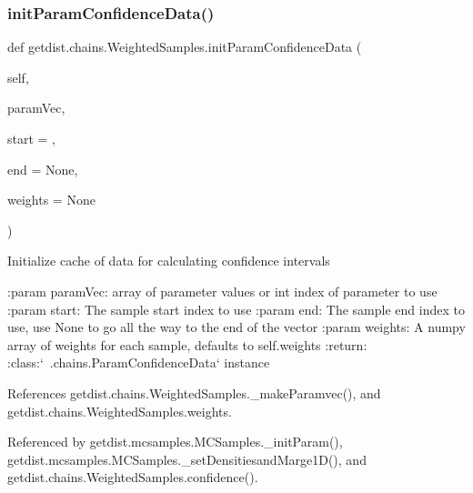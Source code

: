 \subsubsection{\texorpdfstring{init\+Param\+Confidence\+Data()}{initParamConfidenceData()}}
{\footnotesize\ttfamily def getdist.\+chains.\+Weighted\+Samples.\+init\+Param\+Confidence\+Data (\begin{DoxyParamCaption}\item[{}]{self,  }\item[{}]{param\+Vec,  }\item[{}]{start = {},  }\item[{}]{end = {\ttfamily None},  }\item[{}]{weights = {\ttfamily None} }\end{DoxyParamCaption})}

\begin{DoxyVerb}Initialize cache of data for calculating confidence intervals

:param paramVec: array of parameter values or int index of parameter to use
:param start: The sample start index to use 
:param end: The sample end index to use, use None to go all the way to the end of the vector
:param weights: A numpy array of weights for each sample, defaults to self.weights
:return: :class:`~.chains.ParamConfidenceData` instance
\end{DoxyVerb}
 

References getdist.\+chains.\+Weighted\+Samples.\+\_\+make\+Paramvec(), and getdist.\+chains.\+Weighted\+Samples.\+weights.



Referenced by getdist.\+mcsamples.\+M\+C\+Samples.\+\_\+init\+Param(), getdist.\+mcsamples.\+M\+C\+Samples.\+\_\+set\+Densitiesand\+Marge1\+D(), and getdist.\+chains.\+Weighted\+Samples.\+confidence().

